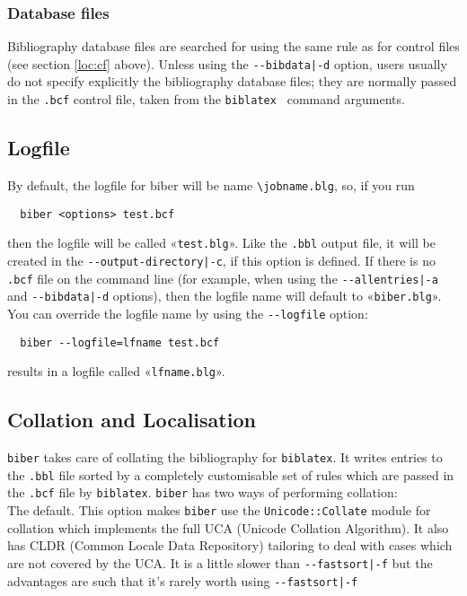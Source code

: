 \documentclass{ltxdockit}
\def\biberex#1{\hbox{\hspace{-4em}\texttt{\small \detokenize{#1}}}}
\begin{document}
\subsubsection{Database files}

Bibliography database files are searched for using the same rule as for
control files (see section \ref{loc:cf} above). Unless using the
\verb+--bibdata|-d+ option, users usually do not specify explicitly the
bibliography database files; they are normally passed in the \verb+.bcf+
control file, taken from the \verb+biblatex + \verb++
command arguments.

\subsection{Logfile}

By default, the logfile for biber will be name \verb+\jobname.blg+,
so, if you run

\begin{verbatim}
  biber <options> test.bcf
\end{verbatim}

\noindent then the logfile will be called «\verb+test.blg+». Like the
\verb+.bbl+ output file, it will be created in the
\verb+--output-directory|-c+, if this option is defined. If there is
no \verb+.bcf+ file on the command line (for example, when using the
\verb+--allentries|-a+ and \verb+--bibdata|-d+ options), then the
logfile name will default to «\verb+biber.blg+». You can
override the logfile name by using the \verb+--logfile+ option:

\begin{verbatim}
  biber --logfile=lfname test.bcf
\end{verbatim}

\noindent results in a logfile called «\verb+lfname.blg+».

\subsection{Collation and Localisation}\label{coll}

\verb+biber+ takes care of collating the bibliography for
\verb+biblatex+. It writes entries to the \verb+.bbl+ file sorted by a
completely customisable set of rules which are passed in the
\verb+.bcf+ file by \verb+biblatex+. \verb+biber+ has two ways of performing
collation:\\[2ex]

\biberex{--collate|-C}
  \noindent The default. This option makes \verb+biber+ use the
  \verb+Unicode::Collate+ module for collation which implements the full UCA (Unicode
  Collation Algorithm). It also has CLDR (Common Locale Data
  Repository) tailoring to deal with cases which are not covered by the
  UCA. It is a little slower than \verb+--fastsort|-f+ but the
  advantages are such that it's rarely worth using \verb+--fastsort|-f+\\[1ex]
\end{document}
